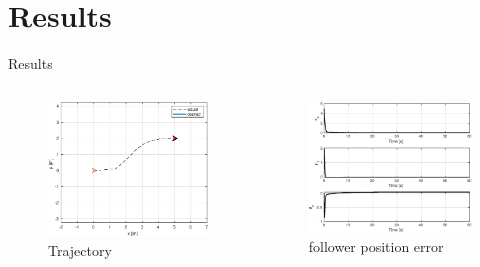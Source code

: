 \documentclass{beamer}
\begin{document}

\section{Results}

\begin{frame}{Results}
\begin{columns}
\begin{column}{0.5\textwidth}
\begin{figure}
\includegraphics[scale=0.4]{figs/matlab/gradientDescent/fixedPoint/trajectory.eps}
\caption{Trajectory}
\end{figure}
\end{column}

\begin{column}{0.5\textwidth}
\begin{center}

\begin{figure}
\includegraphics[scale=0.4]{figs/matlab/gradientDescent/fixedPoint/error.eps}
\caption{follower position error}
\end{figure}
\end{center}


\end{column}
\end{columns}
\end{frame}
\end{document}
